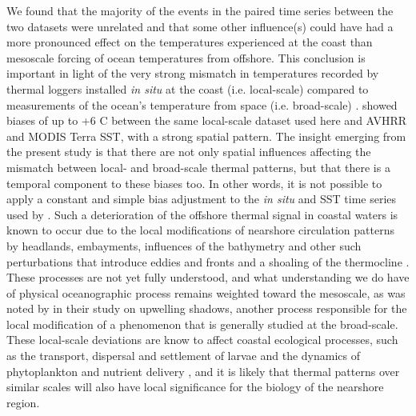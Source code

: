 \documentclass[a4paper,10pt,review]{elsarticle}
\begin{document}
We found that the majority of the events in the paired time series between the two datasets were unrelated and that some other influence(s) could have had a more pronounced effect on the temperatures experienced at the coast than mesoscale forcing of ocean temperatures from offshore. This conclusion is important in light of the very strong mismatch in temperatures recorded by thermal loggers installed \emph{in situ} at the coast (i.e. local-scale) compared to measurements of the ocean's temperature from space (i.e. broad-scale) \citep{Smit2013}. \citet{Smit2013} showed biases of up to +6 \degree C between the same local-scale dataset used here and AVHRR and MODIS Terra SST, with a strong spatial pattern. The insight emerging from the present study is that there are not only spatial influences affecting the mismatch between local- and broad-scale thermal patterns, but that there is a temporal component to these biases too. In other words, it is not possible to apply a constant and simple bias adjustment to the \emph{in situ} and SST time series used by \citet{Smit2013}. Such a deterioration of the offshore thermal signal in coastal waters is known to occur due to the local modifications of nearshore circulation patterns by headlands, embayments, influences of the bathymetry and other such perturbations that introduce eddies and fronts and a shoaling of the thermocline \citep{Okubo1973, Pingree1979, Wolanski1988, Black1990, Grundlingh1991, Graham1997}. These processes are not yet fully understood, and what understanding we do have of physical oceanographic process remains weighted toward the mesoscale, as was noted by \citet{Graham1997} in their study on upwelling shadows, another process responsible for the local modification of a phenomenon that is generally studied at the broad-scale. These local-scale deviations are know to affect coastal ecological processes, such as the transport, dispersal and settlement of larvae \citep{Pineda1994, McCulloch2003, Narvaez2004} and the dynamics of phytoplankton and nutrient delivery \citep{Graham1997, Pineda1994}, and it is likely that thermal patterns over similar scales will also have local significance for the biology of the nearshore region.
\end{document}
